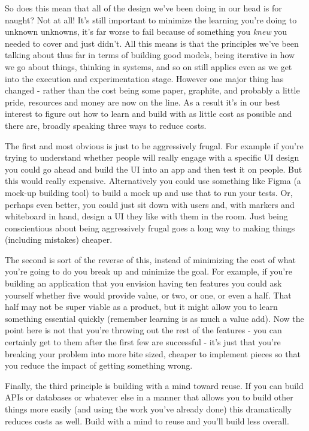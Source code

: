 \documentclass[11pt]{book}
\begin{document}
So does this mean that all of the design we've been doing in our head is for naught? Not at all! It's still important to minimize the learning you're doing to unknown unknowns, it's far worse to fail because of something you \textit{knew} you needed to cover and just didn't. All this means is that the principles we've been talking about thus far in terms of building good models, being iterative in how we go about things, thinking in systems, and so on still applies even as we get into the execution and experimentation stage. However one major thing has changed - rather than the cost being some paper, graphite, and probably a little pride, resources and money are now on the line. As a result it's in our best interest to figure out how to learn and build with as little cost as possible and there are, broadly speaking \cite{macmillan} \cite{patton} three ways to reduce costs. 
\newline

The first and most obvious is just to be aggressively frugal. For example if you're trying to understand whether people will really engage with a specific UI design you could go ahead and build the UI into an app and then test it on people. But this would really expensive. Alternatively you could use something like Figma (a mock-up building tool) to build a mock up and use that to run your tests. Or, perhaps even better, you could just sit down with users and, with markers and whiteboard in hand, design a UI they like with them in the room. Just being conscientious about being aggressively frugal goes a long way to making things (including mistakes) cheaper.
\newline

The second is sort of the reverse of this, instead of minimizing the cost of what you're going to do you break up and minimize the goal. For example, if you're building an application that you envision having ten features you could ask yourself whether five would provide value, or two, or one, or even a half. That half may not be super viable as a product, but it might allow you to learn something essential quickly (remember learning is as much a value add). Now the point here is not that you're throwing out the rest of the features - you can certainly get to them after the first few are successful - it's just that you're breaking your problem into more bite sized, cheaper to implement pieces so that you reduce the impact of getting something wrong. 
\newline

Finally, the third principle is building with a mind toward reuse. If you can build APIs or databases or whatever else in a manner that allows you to build other things more easily (and using the work you've already done) this dramatically reduces costs as well. Build with a mind to reuse and you'll build less overall.
\newline
\end{document}
